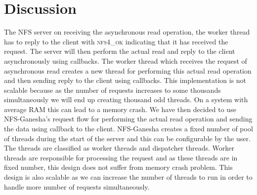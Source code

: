 \section{Discussion}

	The NFS server on receiving the asynchronous read operation, the worker thread has to reply to the client with \textsc{nfs4\_ok} indicating that it has received the request. The server will then perform the actual read and reply to the client asynchronously using callbacks. The worker thread which receives the request of asynchronous read creates a new thread for performing this actual read operation and then sending reply to the client using callbacks. This implementation is not scalable because as the number of requests increases to some thousands simultaneously we will end up creating thousand odd threads. On a system with average RAM this can lead to a memory crash. We have then decided to use NFS-Ganesha's request flow for performing the actual read operation and sending the data using callback to the client. NFS-Ganesha creates a fixed number of pool of threads during the start of the server and this can be configurable by the user. The threads are classified as worker threads and dispatcher threads. Worker threads are responsible for processing the request  and as these threads are in fixed number, this design does not suffer from memory crash problem. This design is also scalable as we can increase the number of threads to run in order to handle more number of requests simultaneously. 